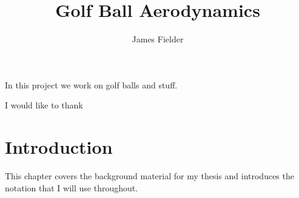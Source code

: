 \documentclass[12pt,MSc,twoside]{muthesis}
\begin{document}
\title{Golf Ball Aerodynamics}
\author{James Fielder}
\def\wordcount{xxxxx}




\beforeabstract

In this project we work on golf balls and stuff.

\afterabstract

I would like to thank

\afterpreface



\chapter{Introduction}
This chapter covers the background material for my thesis and introduces
the notation that I will use throughout.
\end{document}
